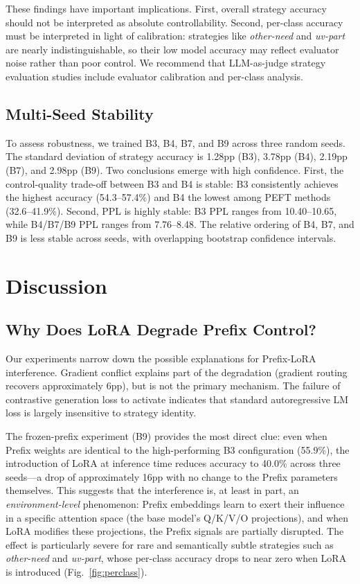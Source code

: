 \documentclass[conference]{IEEEtran}
\begin{document}
These findings have important implications. First, overall strategy accuracy should not be interpreted as absolute controllability. Second, per-class accuracy must be interpreted in light of calibration: strategies like \textit{other-need} and \textit{uv-part} are nearly indistinguishable, so their low model accuracy may reflect evaluator noise rather than poor control. We recommend that LLM-as-judge strategy evaluation studies include evaluator calibration and per-class analysis.

\subsection{Multi-Seed Stability}

To assess robustness, we trained B3, B4, B7, and B9 across three random seeds. The standard deviation of strategy accuracy is 1.28pp (B3), 3.78pp (B4), 2.19pp (B7), and 2.98pp (B9). Two conclusions emerge with high confidence. First, the control-quality trade-off between B3 and B4 is stable: B3 consistently achieves the highest accuracy (54.3--57.4\%) and B4 the lowest among PEFT methods (32.6--41.9\%). Second, PPL is highly stable: B3 PPL ranges from 10.40--10.65, while B4/B7/B9 PPL ranges from 7.76--8.48. The relative ordering of B4, B7, and B9 is less stable across seeds, with overlapping bootstrap confidence intervals.

\section{Discussion}

\subsection{Why Does LoRA Degrade Prefix Control?}

Our experiments narrow down the possible explanations for Prefix-LoRA interference. Gradient conflict explains part of the degradation (gradient routing recovers approximately 6pp), but is not the primary mechanism. The failure of contrastive generation loss to activate indicates that standard autoregressive LM loss is largely insensitive to strategy identity.

The frozen-prefix experiment (B9) provides the most direct clue: even when Prefix weights are identical to the high-performing B3 configuration (55.9\%), the introduction of LoRA at inference time reduces accuracy to 40.0\% across three seeds---a drop of approximately 16pp with no change to the Prefix parameters themselves. This suggests that the interference is, at least in part, an \textit{environment-level} phenomenon: Prefix embeddings learn to exert their influence in a specific attention space (the base model's Q/K/V/O projections), and when LoRA modifies these projections, the Prefix signals are partially disrupted. The effect is particularly severe for rare and semantically subtle strategies such as \textit{other-need} and \textit{uv-part}, whose per-class accuracy drops to near zero when LoRA is introduced (Fig.~\ref{fig:perclass}).
\end{document}
